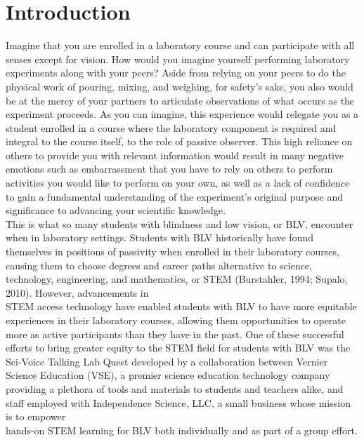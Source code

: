 \documentclass[11.5pt]{sig-alternate}
\begin{document}
\section*{Introduction}
\begin{large}
Imagine that you are enrolled in a laboratory course and can participate with all senses except for vision. How would you imagine yourself performing laboratory experiments along with your peers? Aside from relying on your peers to do the physical work of pouring, mixing, and weighing, for safety’s sake, you also would be at the mercy of your partners to articulate observations of what occurs as the experiment proceeds. As you can imagine, this experience would relegate you as a student enrolled in a course where the laboratory component is required and integral to the course itself, to the role of passive observer. This high reliance on others to provide you with relevant information would result in many negative emotions such as embarrassment that you have to rely on others to perform activities you would like to perform on your own, as well as a lack of confidence to gain a fundamental understanding of the experiment’s original purpose and significance to advancing your scientific knowledge.\\

This is what so many students with blindness and low vision, or BLV, encounter when in laboratory settings. Students with BLV historically have found themselves in positions of passivity when enrolled in their laboratory courses, causing them to choose degrees and career paths alternative to science, technology, engineering, and mathematics, or STEM (Burstahler, 1994; Supalo, 2010). However, advancements in \\STEM access technology have enabled students with BLV to have more equitable experiences in their laboratory courses, allowing them opportunities to operate more as active participants than they have in the past. One of these successful efforts to bring greater equity to the STEM field for students with BLV was the Sci-Voice Talking Lab Quest developed by a collaboration between Vernier Science Education (VSE), a premier science education technology company providing a plethora of tools and materials to students and teachers alike, and staff employed with Independence Science, LLC, a small business whose mission is to empower \\hands-on STEM learning for BLV both individually and as part of a group effort.\\


\end{large}
\end{document}
